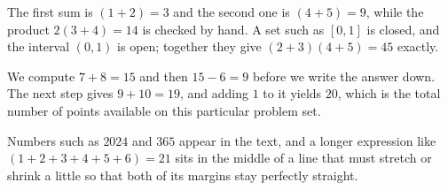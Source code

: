 \documentclass[11pt]{article}
\begin{document}
The first sum is $(1+2)=3$ and the second one is $(4+5)=9$, while the
product $2(3+4)=14$ is checked by hand. A set such as $[0,1]$ is closed, and
the interval $(0,1)$ is open; together they give $(2+3)(4+5)=45$ exactly.

We compute $7+8=15$ and then $15-6=9$ before we write the answer down. The
next step gives $9+10=19$, and adding $1$ to it yields $20$, which is the
total number of points available on this particular problem set.

Numbers such as $2024$ and $365$ appear in the text, and a longer expression
like $(1+2+3+4+5+6)=21$ sits in the middle of a line that must stretch or
shrink a little so that both of its margins stay perfectly straight.
\end{document}
